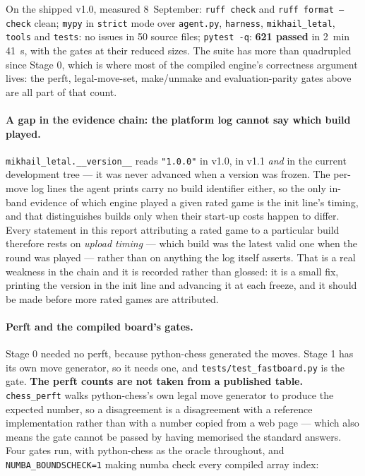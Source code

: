 \documentclass[11pt,a4paper]{article}
\newcommand{\code}[1]{\texttt{#1}}
\begin{document}
On the shipped v1.0, measured 8~September: \code{ruff check} and \code{ruff format --check} clean;
\code{mypy} in \code{strict} mode over \code{agent.py}, \code{harness}, \code{mikhail\_letal},
\code{tools} and \code{tests}: no issues in 50 source files; \code{pytest -q}: \textbf{621 passed} in
2~min 41~s, with the gates at their reduced sizes. The suite has more than quadrupled since Stage 0,
which is where most of the compiled engine's correctness argument lives: the perft, legal-move-set,
make/unmake and evaluation-parity gates above are all part of that count.

\paragraph{A gap in the evidence chain: the platform log cannot say which build played.}
\code{mikhail\_letal.\_\_version\_\_} reads \code{"1.0.0"} in v1.0, in v1.1 \emph{and} in the current
development tree --- it was never advanced when a version was frozen. The per-move log lines the agent
prints carry no build identifier either, so the only in-band evidence of which engine played a given
rated game is the init line's timing, and that distinguishes builds only when their start-up costs
happen to differ. Every statement in this report attributing a rated game to a particular build
therefore rests on \emph{upload timing} --- which build was the latest valid one when the round was
played --- rather than on anything the log itself asserts. That is a real weakness in the chain and it
is recorded rather than glossed: it is a small fix, printing the version in the init line and advancing
it at each freeze, and it should be made before more rated games are attributed.

\paragraph{Perft and the compiled board's gates.} Stage 0 needed no perft, because python-chess
generated the moves. Stage 1 has its own move generator, so it needs one, and \code{tests/test\_fastboard.py}
is the gate. \textbf{The perft counts are not taken from a published table.} \code{chess\_perft} walks
python-chess's own legal move generator to produce the expected number, so a disagreement is a
disagreement with a reference implementation rather than with a number copied from a web page --- which
also means the gate cannot be passed by having memorised the standard answers. Four gates run, with
python-chess as the oracle throughout, and \code{NUMBA\_BOUNDSCHECK=1} making numba check every compiled
array index:
\end{document}
